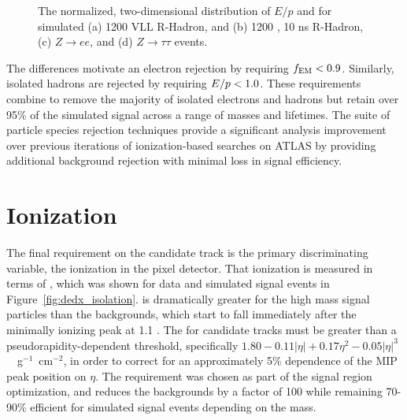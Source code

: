 \begin{figure}[htb]
{}
\caption{The normalized, two-dimensional distribution of $E/p$ and \emfrac for simulated (a) 1200 \GeV \ac{VLL} R-Hadron, and (b) 1200 \GeV, 10 ns R-Hadron, (c) $Z\rightarrow e e$, and (d) $Z\rightarrow \tau\tau$ events.}
\label{fig:eoverp_emfrac}
\end{figure}

The differences motivate an electron rejection by requiring $f_\mathrm{EM} < 0.9$.
Similarly, isolated hadrons are rejected by requiring $E/p < 1.0$.
These requirements combine to remove the majority of isolated electrons and hadrons but retain over 95\% of the simulated signal across a range of masses and lifetimes.
The suite of particle species rejection techniques provide a significant analysis improvement over previous iterations of ionization-based searches on ATLAS by providing additional background rejection with minimal loss in signal efficiency. 




\section{Ionization}

The final requirement on the candidate track is the primary discriminating variable, the ionization in the pixel detector.
That ionization is measured in terms of \dedx, which was shown for data and simulated signal events in Figure~\ref{fig:dedx_isolation}.
\dedx is dramatically greater for the high mass signal particles than the backgrounds, which start to fall immediately after the minimally ionizing peak at 1.1 \MeVgcm. 
The \dedx for candidate tracks must be greater than a pseudorapidity-dependent threshold, specifically $1.80 - 0.11 |\eta| + 0.17 \eta^2 - 0.05 |\eta|^3 $~\MeV~g$^{-1}$~cm$^{-2}$, in order to correct for an approximately 5\% dependence of the \ac{MIP} peak position on $\eta$. 
The requirement was chosen as part of the signal region optimization, and reduces the backgrounds by a factor of 100 while remaining 70-90\% efficient for simulated signal events depending on the mass.

